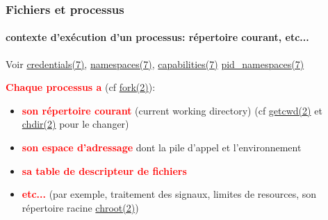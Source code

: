 \documentclass[xcolor=svgnames,final,smaller,a4]{beamer}
\begin{document}
\begin{frame}
  \frametitle{Fichiers et processus}
  \framesubtitle{contexte d'exécution d'un processus: répertoire courant, etc...}

  Voir
  \href{https://man7.org/linux/man-pages/man7/credentials.7.html}{credentials(7)},
  \href{https://man7.org/linux/man-pages/man7/namespaces.7.html}{namespaces(7)},
  \href{https://man7.org/linux/man-pages/man7/capabilities.7.html}{capabilities(7)}
  \href{https://man7.org/linux/man-pages/man7/pid\_namespaces.7.html}{pid\_namespaces(7)}

   \textbf{\textcolor{red}{Chaque processus a}} (cf  \href{https://man7.org/linux/man-pages/man2/fork.2.html}{fork(2)}):

  \begin{itemize}
  \item  \textbf{\textcolor{red}{son répertoire courant}} (current working directory)  (cf  \href{https://man7.org/linux/man-pages/man2/getcwd.2.html}{getcwd(2)} et \href{https://man7.org/linux/man-pages/man2/chdir.2.html}{chdir(2)} pour le changer)

  \item  \textbf{\textcolor{red}{son espace d'adressage}} dont la pile d'appel et l'environnement
    
  \item  \textbf{\textcolor{red}{sa table de descripteur de fichiers}}

    \item  \textbf{\textcolor{red}{etc...}} (par exemple, traitement des signaux, limites de resources, son répertoire racine \href{https://man7.org/linux/man-pages/man2/chroot.2.html}{chroot(2)})
    
  \end{itemize}
  
\end{frame}
\end{document}
